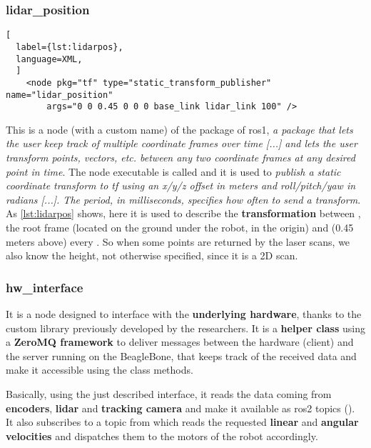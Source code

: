 \subsubsection{lidar\_position}

\begin{lstlisting}[
  label={lst:lidarpos},
  language=XML,
  ]
    <node pkg="tf" type="static_transform_publisher" name="lidar_position"
        args="0 0 0.45 0 0 0 base_link lidar_link 100" />
\end{lstlisting}

This is a node (with a custom name) of the  package of \acrshort{ros}1, \textit{a package that lets the user keep track of multiple coordinate frames over time [...] and lets the user transform points, vectors, etc. between any two coordinate frames at any desired point in time}. \cite{tf} The node executable is called  and it is used to \textit{publish a static coordinate transform to tf using an x/y/z offset in meters and roll/pitch/yaw in radians [...]. The period, in milliseconds, specifies how often to send a transform}. \cite{tf} 
As \autoref{lst:lidarpos} shows, here it is used to describe the \textbf{transformation} between , the root frame (located on the ground under the robot, in the origin) and  (0.45 meters above) every . So when some points are returned by the laser scans, we also know the height, not otherwise specified, since it is a 2D scan.  

\subsubsection{hw\_interface}

It is a node designed to interface with the \textbf{underlying hardware}, thanks to the custom  library previously developed by the researchers. It is a \textbf{helper class} using a \textbf{ZeroMQ framework} to deliver messages between the hardware (client) and the server running on the BeagleBone, that keeps track of the received data and make it accessible using the class methods.

Basically, using the just described interface, it reads the data coming from \textbf{encoders}, \textbf{lidar} and \textbf{tracking camera} and make it available as \acrshort{ros}2 topics (). It also subscribes to a  topic from which reads the requested \textbf{linear} and \textbf{angular velocities} and dispatches them to the motors of the robot accordingly.

